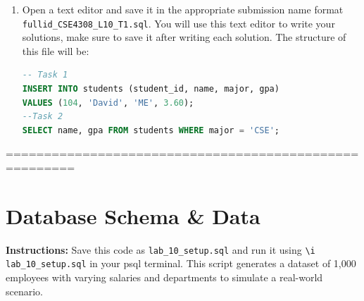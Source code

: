 \documentclass[12pt,a4paper]{article}
\begin{document}
\begin{enumerate}
After loading the SQL file, reconnect to PostgreSQL to verify that the tables have been created.

1. Reconnect to Your Database:

   \begin{lstlisting}[language=SQL]
   psql -h localhost -U student_12345 -d cse4308_12345
   \end{lstlisting}

2. Check Tables:

   Verify the tables have been created by listing them:

   \begin{lstlisting}[language=SQL]
   \dt
   \end{lstlisting}

3. View Table Data:

   Verify the data by running the following SQL queries:

   \begin{lstlisting}[language=SQL]
   SELECT * FROM <table_name>;
   \end{lstlisting}

\item Open a text editor and save it in the appropriate submission name format \\ \texttt{fullid\_CSE4308\_L10\_T1.sql}. You will use this text editor to write your solutions, make sure to save it after writing each solution. The structure of this file will be:
\begin{lstlisting}[language=SQL]
-- Task 1
INSERT INTO students (student_id, name, major, gpa)
VALUES (104, 'David', 'ME', 3.60);
--Task 2
SELECT name, gpa FROM students WHERE major = 'CSE';
\end{lstlisting}
\end{enumerate}
=======================================================
\section{Database Schema \& Data}
\textbf{Instructions:} Save this code as \texttt{lab\_10\_setup.sql} and run it using \texttt{\textbackslash i lab\_10\_setup.sql} in your psql terminal. This script generates a dataset of 1,000 employees with varying salaries and departments to simulate a real-world scenario.
\end{document}
